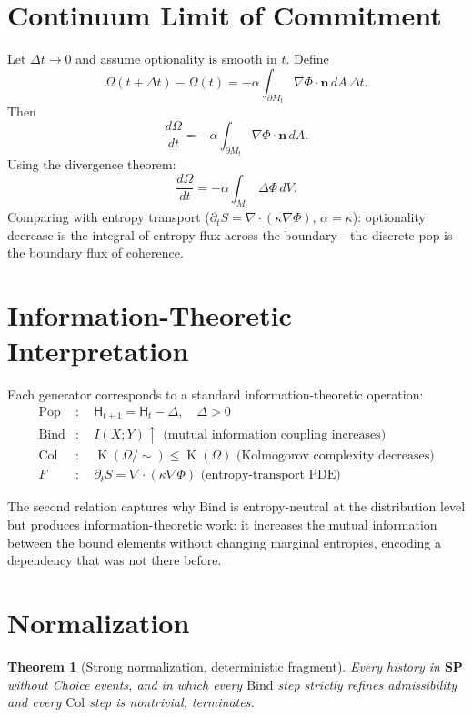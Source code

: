 \documentclass[12pt,a4paper]{article}
\newtheorem{theorem}{Theorem}[section]
\theoremstyle{definition}
\theoremstyle{remark}
\newcommand{\Ent}{\ensuremath{\mathsf{H}}}
\newcommand{\SP}{\mathbf{SP}}
\newcommand{\Pop}{\ensuremath{\mathrm{Pop}}}
\newcommand{\Bind}{\ensuremath{\mathrm{Bind}}}
\newcommand{\Col}{\ensuremath{\mathrm{Col}}}
\DeclareMathOperator{\Kc}{K}
\newcommand{\PhiF}{\Phi}
\newcommand{\SF}{S}
\begin{document}
\section{Continuum Limit of Commitment} \label{sec:continuum}

Let $\Delta t \to 0$ and assume optionality is smooth in $t$. Define
\[
\Omega(t+\Delta t) - \Omega(t) = -\alpha \int_{\partial M_t} \nabla\Phi \cdot \mathbf{n}\, dA \,\Delta t.
\]
Then
\[
\frac{d\Omega}{dt} = -\alpha \int_{\partial M_t} \nabla\Phi \cdot \mathbf{n}\, dA.
\]
Using the divergence theorem:
\[
\frac{d\Omega}{dt} = -\alpha \int_{M_t} \Delta \Phi\, dV.
\]
Comparing with entropy transport ($\partial_t S = \nabla\cdot(\kappa\nabla\Phi)$, $\alpha = \kappa$):
optionality decrease is the integral of entropy flux across the boundary---the discrete pop is the boundary flux of coherence.

\section{Information-Theoretic Interpretation}
\label{sec:info}

Each generator corresponds to a standard information-theoretic operation:
\begin{align*}
\Pop &:\quad\Ent_{t+1}=\Ent_t-\Delta,\quad\Delta>0 \\
\Bind &:\quad I(X;Y)\uparrow\text{ (mutual information coupling increases)} \\
\Col &:\quad\Kc(\Omega/{\sim})\le\Kc(\Omega)\text{ (Kolmogorov complexity decreases)} \\
F &:\quad\partial_t\SF=\nabla\cdot(\kappa\nabla\PhiF)\text{ (entropy-transport PDE)}
\end{align*}

The second relation captures why $\Bind$ is entropy-neutral at the distribution level
but produces information-theoretic work: it increases the mutual information between
the bound elements without changing marginal entropies, encoding a dependency that was
not there before.

\section{Normalization}
\label{sec:norm}

\begin{theorem}[Strong normalization, deterministic fragment]
\label{thm:sn}
Every history in $\SP$ without Choice events, and in which every $\Bind$ step strictly refines admissibility and every $\Col$ step is nontrivial, terminates.
\end{theorem}
\end{document}
